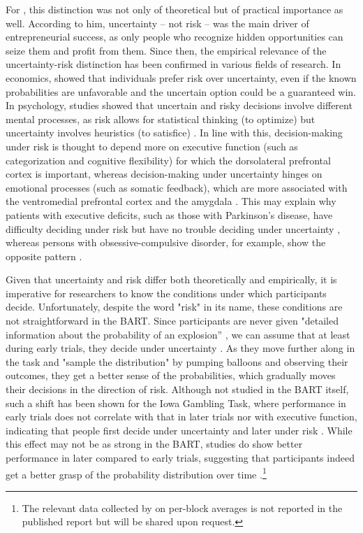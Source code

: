 \documentclass[serif, twocolumn, authordate, meta]{jote-article}
\begin{document}
For \textcite{Knight1921}, this distinction was not only of theoretical but of practical importance as well. According to him, uncertainty -- not risk -- was the main driver of entrepreneurial success, as only people who recognize hidden opportunities can seize them and profit from them. Since then, the empirical relevance of the uncertainty-risk distinction has been confirmed in various fields of research. In economics, \textcite{Ellsberg1961} showed that individuals prefer risk over uncertainty, even if the known probabilities are unfavorable and the uncertain option could be a guaranteed win. In psychology, studies showed that uncertain and risky decisions involve different mental processes, as risk allows for statistical thinking (to optimize) but uncertainty involves heuristics (to satisfice) \parencite{Volz2012}. In line with this, decision-making under risk is thought to depend more on executive function (such as categorization and cognitive flexibility) for which the dorsolateral prefrontal cortex is important, whereas decision-making under uncertainty hinges on emotional processes (such as somatic feedback), which are more associated with the ventromedial prefrontal cortex and the amygdala \parencite{Brand2006}. This may explain why patients with executive deficits, such as those with Parkinson's disease, have difficulty deciding under risk but have no trouble deciding under uncertainty \parencite{Euteneuer2009}, whereas persons with obsessive-compulsive disorder, for example, show the opposite pattern \parencite{Starcke2009, Starcke2010}.

Given that uncertainty and risk differ both theoretically and empirically, it is imperative for researchers to know the conditions under which participants decide. Unfortunately, despite the word "risk" in its name, these conditions are not straightforward in the BART. Since participants are never given "detailed information about the probability of an explosion'' \parencite[p. 77]{Lejuez2002}, we can assume that at least during early trials, they decide under uncertainty \parencite{Bishara2009, deGroot2018, Schonberg2011}. As they move further along in the task and "sample the distribution" by pumping balloons and observing their outcomes, they get a better sense of the probabilities, which gradually moves their decisions in the direction of risk. Although not studied in the BART itself, such a shift has been shown for the Iowa Gambling Task, where performance in early trials does not correlate with that in later trials nor with executive function, indicating that people first decide under uncertainty and later under risk \parencite{Brand2006,Brand2007}. While this effect may not be as strong in the BART, studies do show better performance in later compared to early trials, suggesting that participants indeed get a better grasp of the probability distribution over time \parencite{Lejuez2002,deGroot2019}.\footnote{The relevant data collected by \cite{deGroot2019} on per-block averages is not reported in the published report but will be shared upon request.}
\end{document}
